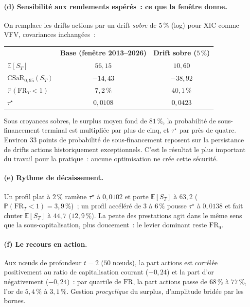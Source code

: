 \documentclass[11pt,letterpaper]{article}
\newcommand{\E}{\mathbb{E}}
\newcommand{\prob}{\mathbb{P}}
\newcommand{\CSaR}{\mathrm{CSaR}}
\newcommand{\taustar}{\tau^{\star}}
\theoremstyle{definition}
\begin{document}
\paragraph{(d) Sensibilité aux rendements espérés~: ce que la fenêtre donne.}
On remplace les drifts actions par un drift \emph{sobre} de $5\,\%$ (log) pour
XIC comme VFV, covariances inchangées~:

\begin{center}
\begin{tabular}{lcc}
\toprule
 & Base (fenêtre 2013--2026) & Drift sobre ($5\,\%$) \\
\midrule
$\E[S_T]$                 & $56{,}15$  & $10{,}60$ \\
$\CSaR_{0{,}95}(S_T)$     & $-14{,}43$ & $-38{,}92$ \\
$\prob(\mathrm{FR}_T<1)$  & $7{,}2\,\%$ & $40{,}1\,\%$ \\
$\taustar$                & $0{,}0108$ & $0{,}0423$ \\
\bottomrule
\end{tabular}
\end{center}

Sous croyances sobres, le surplus moyen fond de $81\,\%$, la probabilité de
sous-financement terminal est multipliée par plus de cinq, et $\taustar$ par
près de quatre. Environ $33$ points de probabilité de sous-financement
reposent sur la persistance de drifts actions historiquement exceptionnels.
C'est le résultat le plus important du travail pour la pratique~: aucune
optimisation ne crée cette sécurité.

\paragraph{(e) Rythme de décaissement.}
Un profil plat à $2\,\%$ ramène $\taustar$ à $0{,}0102$ et porte $\E[S_T]$ à
$63{,}2$ ($\prob(\mathrm{FR}_T<1) = 3{,}9\,\%$)~; un profil accéléré de $3$ à
$6\,\%$ pousse $\taustar$ à $0{,}0138$ et fait chuter $\E[S_T]$ à $44{,}7$
($12{,}9\,\%$). La pente des prestations agit dans le même sens que la
sous-capitalisation, plus doucement~: le levier dominant reste
$\mathrm{FR}_0$.

\paragraph{(f) Le recours en action.}
Aux n\oe uds de profondeur $t = 2$ ($50$ n\oe uds), la part actions est
corrélée positivement au ratio de capitalisation courant ($+0{,}24$) et la part
d'or négativement ($-0{,}24$)~: par quartile de $\mathrm{FR}$, la part actions
passe de $68\,\%$ à $77\,\%$, l'or de $5{,}4\,\%$ à $3{,}1\,\%$. Gestion
\emph{procyclique} du surplus, d'amplitude bridée par les bornes.
\end{document}
